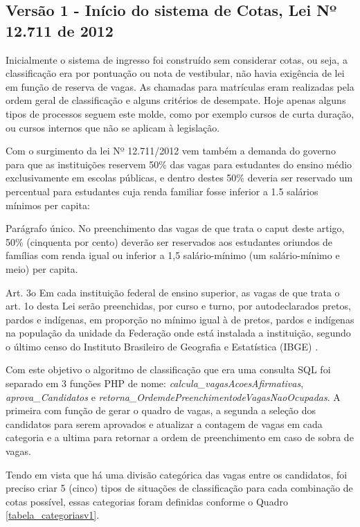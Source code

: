 \subsection{Versão 1 - Início do sistema de Cotas, Lei Nº 12.711 de 2012}
\label{versao1}

Inicialmente o sistema de ingresso foi construído sem considerar cotas, ou seja, a classificação era por pontuação ou nota de vestibular, não havia exigência de lei em função de reserva de vagas. As chamadas para matrículas eram realizadas pela ordem geral de classificação e alguns critérios de desempate. Hoje apenas alguns tipos de processos seguem este molde, como por exemplo cursos de curta duração, ou cursos internos que não se aplicam à legislação.

Com o surgimento da lei Nº 12.711/2012 vem também a demanda do governo para que as instituições reservem 50\% das vagas para estudantes do ensino médio exclusivamente em escolas públicas, e dentro destes 50\% deveria ser reservado um percentual para estudantes cuja renda familiar fosse inferior a 1.5 salários mínimos per capita:

\begin{citacao}
Parágrafo único.  No preenchimento das vagas de que trata o caput deste artigo, 50\% (cinquenta por cento) deverão ser reservados aos estudantes oriundos de famílias com renda igual ou inferior a 1,5 salário-mínimo (um salário-mínimo e meio) per capita.

Art. 3o  Em cada instituição federal de ensino superior, as vagas de que trata o art. 1o desta Lei serão preenchidas, por curso e turno, por autodeclarados pretos, pardos e indígenas, em proporção no mínimo igual à de pretos, pardos e indígenas na população da unidade da Federação onde está instalada a instituição, segundo o último censo do Instituto Brasileiro de Geografia e Estatística (IBGE) \cite{leicotas}.
\end{citacao}

Com este objetivo o algoritmo de classificação que era uma consulta SQL foi separado em 3 funções PHP de nome: \textit{calcula\_vagasAcoesAfirmativas}, \textit{aprova\_Candidatos} e \textit{retorna\_OrdemdePreenchimentodeVagasNaoOcupadas}.  A primeira com função de gerar o quadro de vagas, a segunda a seleção dos candidatos para serem aprovados e atualizar a contagem de vagas em cada categoria e a ultima para retornar a ordem de preenchimento em caso de sobra de vagas.

Tendo em vista que há uma divisão categórica das vagas entre os candidatos, foi preciso criar 5 (cinco) tipos de situações de classificação para cada combinação de cotas possível, essas categorias foram definidas conforme o Quadro \ref{tabela_categoriasv1}.

